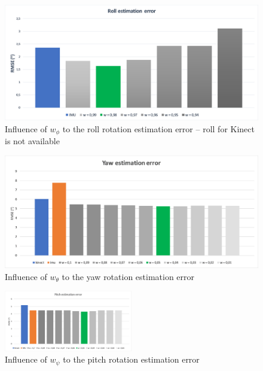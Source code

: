 \documentclass[sensors,article,submit,moreauthors,pdftex,10pt,a4paper]{mdpi}
\begin{document}
\begin{minipage}{\linewidth}
	\centering
	\begin{minipage}[b]{0.45\linewidth}
		\begin{figure}[H] %
			\includegraphics[width=\textwidth]{Figure13}
			\caption{Influence of $w_\phi$ to the roll rotation estimation error -- roll for Kinect is not available}
			\label{fig:w:roll}
		\end{figure}
	\end{minipage}
	\hfill
	\begin{minipage}[b]{0.45\linewidth}
		\begin{figure}[H] %
			\includegraphics[width=\textwidth]{Figure14}
			\caption{Influence of $w_\theta$ to the yaw rotation estimation error}
			\label{fig:w:yaw}	
		\end{figure}
	\end{minipage}
\end{minipage}

\begin{figure}[H] %
	\centering
	\includegraphics[width=0.5\textwidth]{Figure15}
	\caption{Influence of $w_\psi$ to the pitch rotation estimation error}
	\label{fig:w:pitch}	
\end{figure}
\end{document}
